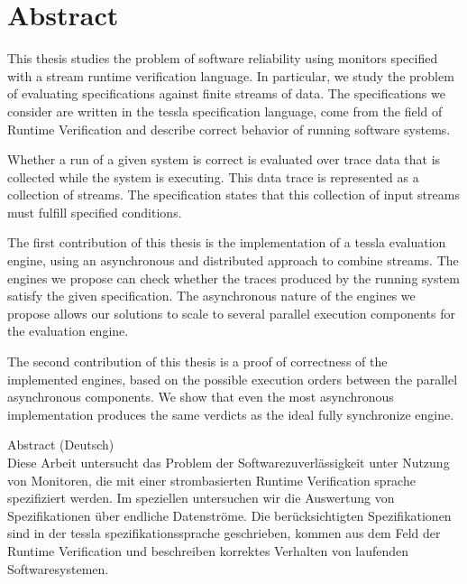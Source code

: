 %
\chapter*{Abstract}
\label{sec:abstract}
\vspace*{-10mm}

This thesis studies the problem of software reliability using monitors specified with a stream runtime verification language.
In particular, we study the problem of evaluating specifications against finite streams of data.
The specifications we consider are written in the \gls{tessla} specification language, come from the field of Runtime Verification and describe correct behavior of running software systems.

Whether a run of a given system is correct is evaluated over trace data that is collected while the system is executing.
This data trace is represented as a collection of streams.
The specification states that this collection of input streams must fulfill specified conditions.

The first contribution of this thesis is the implementation of a \gls{tessla} evaluation engine, using an asynchronous and distributed approach to combine streams.
The engines we propose can check whether the traces produced by the running system satisfy the given specification.
The asynchronous nature of the engines we propose allows our solutions to scale to several parallel execution components for the evaluation engine.

The second contribution of this thesis is a proof of correctness of the implemented engines, based on the possible execution orders between the parallel asynchronous components.
We show that even the most asynchronous implementation produces the same verdicts as the ideal fully synchronize engine.



\clearpage

{Abstract (Deutsch)}\label{sec:abstract-diff} \\

Diese Arbeit untersucht das Problem der Softwarezuverlässigkeit unter Nutzung von Monitoren, die mit einer strombasierten Runtime Verification sprache spezifiziert werden.
Im speziellen untersuchen wir die Auswertung von Spezifikationen über endliche Datenströme.
Die berücksichtigten Spezifikationen sind in der \gls{tessla} spezifikationssprache geschrieben, kommen aus dem Feld der Runtime Verification und beschreiben korrektes Verhalten von laufenden Softwaresystemen.

